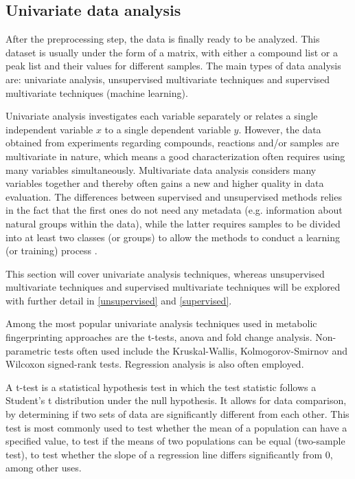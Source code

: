 
\subsection{Univariate data analysis} \label{univariate}

After the preprocessing step, the data is finally ready to be analyzed. This dataset is usually under the form of a matrix, with either a compound list or a peak list and their values for different samples. The main types of data analysis are: univariate analysis, unsupervised multivariate techniques and supervised multivariate techniques (machine learning).

Univariate analysis investigates each variable separately or relates a single independent variable $ x $ to a single dependent variable $ y $. However, the data obtained from experiments regarding compounds, reactions and/or samples are multivariate in nature, which means a good characterization often requires using many variables simultaneously. Multivariate data analysis considers many variables together and thereby often gains a new and higher quality in data evaluation. The differences between supervised and unsupervised methods relies in the fact that the first ones do not need any metadata (e.g. information about natural groups within the data), while the latter requires samples to be divided into at least two classes (or groups) to allow the methods to conduct a learning (or training) process \citep{varmuza2009introduction}.

This section will cover univariate analysis techniques, whereas unsupervised multivariate techniques and supervised multivariate techniques will be explored with further detail in \autoref{unsupervised} and \autoref{supervised}. 

Among the most popular univariate analysis techniques used in metabolic fingerprinting approaches are the t-tests, \acrfull{anova} and fold change analysis. Non-parametric tests often used include the Kruskal-Wallis, Kolmogorov-Smirnov and Wilcoxon signed-rank tests. Regression analysis is also often employed. 

A t-test is a statistical hypothesis test in which the test statistic follows a Student's t distribution under the null hypothesis. It allows for data comparison, by determining if two sets of data are significantly different from each other. This test is most commonly used to test whether the mean of a population can have a specified value, to test if the means of two populations can be equal (two-sample test), to test whether the slope of a regression line differs significantly from 0, among other uses.

